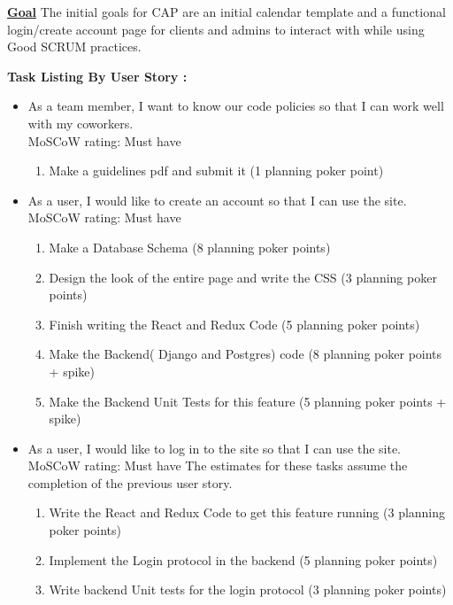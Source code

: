 \documentclass[2pt]{article}
\begin{document}
\begin{flushleft}
        \item \textbf{\underline{Goal}} \indent The initial goals for CAP are an initial calendar template and a functional login/create account page for clients and admins to interact with while using Good SCRUM practices.
        \item \textbf{Task Listing By User Story :}
        \begin{itemize}
            \item As a team member, I want to know our code policies so that I can work well with my coworkers. 
            \\MoSCoW rating: Must have
            \begin{enumerate}
                \item Make a guidelines pdf and submit it (1 planning poker point)
            \end{enumerate}
            \item As a user, I would like to create an account so that I can use the site. 
            \\MoSCoW rating: Must have
            \begin{enumerate}[resume]
                \item Make a Database Schema (8 planning poker points)
                \item Design the look of the entire page and write the CSS (3 planning poker points)
                \item Finish writing the React and Redux Code (5 planning poker points)
                \item Make the Backend( Django and Postgres) code (8 planning poker points + spike)
                \item Make the Backend Unit Tests for this feature (5 planning poker points + spike)
            \end{enumerate}
						 \item As a user, I would like to log in to the site so that I can use the site.
						 \\MoSCoW rating: Must have  \quad The estimates for these tasks assume the completion of the previous user story.
						 \begin{enumerate}[resume]
						 		  \item Write the React and Redux Code to get this feature running (3 planning poker points)
						 		  \item Implement the Login protocol in the backend (5 planning poker points)
						 		  \item Write backend Unit tests for the login protocol (3 planning poker points)

\end{enumerate}
\end{itemize}
\end{flushleft}
\end{document}
